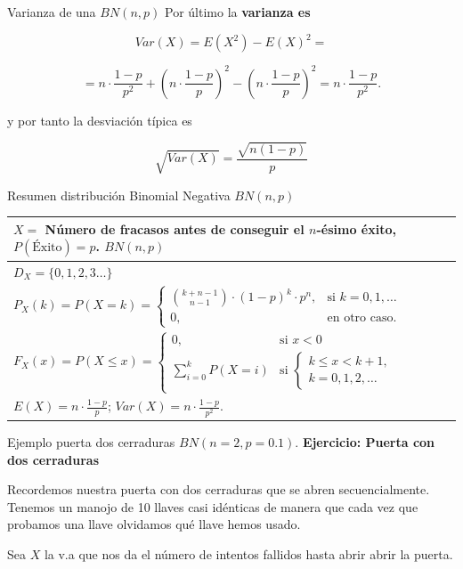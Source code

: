\documentclass[
  ignorenonframetext,
  aspectratio=169]{beamer}
\begin{document}
\begin{frame}{Varianza de una \(BN(n,p)\)}
\protect\hypertarget{varianza-de-una-bnnp}{}
Por último la \textbf{varianza es}

\[
Var(X)=E(X^2)-E(X)^2=
\]

\[=n\cdot \frac{1-p}{p^2}+\left(n\cdot \frac{1-p}{p}\right)^2-\left(n\cdot \frac{1-p}{p}\right)^2=
n\cdot \frac{1-p}{p^2}.\]

y por tanto la desviación típica es

\[\sqrt{Var(X)} = \frac{\sqrt{n(1-p)}}{p}\]
\end{frame}

\begin{frame}{Resumen distribución Binomial Negativa \(BN(n,p)\)}
\protect\hypertarget{resumen-distribuciuxf3n-binomial-negativa-bnnp}{}
\renewcommand{\arraystretch}{1.8}
\begin{table}
\centering
\begin{tabular}{|l|}
\hline\rowcolor{LightBlue}
 $X=$ Número de fracasos antes de conseguir el $n$-ésimo éxito, $P(\mbox{Éxito})=p$. $BN(n,p)$ 
\\\hline
$D_X=\{0,1,2,3\ldots\}$  \\\hline
$P_X(k)=P(X=k)=\left\{\begin{array}{ll} {k+n-1\choose n-1} \cdot (1-p)^{k}\cdot p^n, & \mbox{si }  k=0,1,\ldots \\ 0, & \mbox{en otro caso.}\end{array}\right.$\\\hline
$
F_X(x)=P(X\leq x)=
\left\{
\begin{array}{ll} 0, & \mbox{si } x<0\\\displaystyle\sum_{i=0}^{k} P(X=i) & \mbox{si  }\left\{\begin{array}{l}k\leq x< k+1,\\k=0,1,2,\ldots\end{array}\right.\end{array}\right.$ 
\\\hline
$E(X)=n\cdot\frac{1-p}{p}$;  $Var(X)=n\cdot \frac{1-p}{p^2}.$ \\\hline
\end{tabular}
\end{table}
\end{frame}

\begin{frame}{Ejemplo puerta dos cerraduras \(BN(n=2,p=0.1)\).}
\protect\hypertarget{ejemplo-puerta-dos-cerraduras-bnn2p0.1.}{}
\textbf{Ejercicio: Puerta con dos cerraduras}

Recordemos nuestra puerta con dos cerraduras que se abren
secuencialmente. Tenemos un manojo de 10 llaves casi idénticas de manera
que cada vez que probamos una llave olvidamos qué llave hemos usado.

Sea \(X\) la v.a que nos da el número de intentos fallidos hasta abrir
abrir la puerta.
\end{frame}
\end{document}
